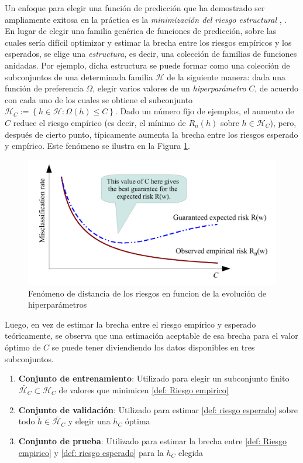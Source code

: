 Un enfoque para elegir una funci\'on de predicci\'on que ha demostrado ser ampliamente exitosa en la pr\'actica es la \textit{minimizaci\'on del riesgo estructural} \cite{vapnik:1974}, \cite{vapnik:1998}. En lugar de elegir una familia gen\'erica de funciones de predicci\'on, sobre las cuales ser\'ia dif\'icil optimizar y estimar la brecha entre los riesgos emp\'iricos y los esperados, se elige una \textit{estructura}, es decir, una colecci\'on de familias de funciones anidadas. Por ejemplo, dicha estructura se puede formar como una colecci\'on de subconjuntos de una determinada familia $\mathcal{H}$ de la siguiente manera: dada una funci\'on de preferencia $\Omega$, elegir varios valores de un \textit{hiperpar\'ametro} $C$, de acuerdo con cada uno de los cuales se obtiene el subconjunto $\mathcal{H}_C := \left\lbrace h \in \mathcal{H} : \Omega (h) \leq C \right\rbrace$. Dado un n\'umero fijo de ejemplos, el aumento de $C$ reduce el riesgo emp\'irico (es decir, el m\'inimo de $R_n (h) $ sobre $h \in \mathcal{H}_C$), pero, despu\'es de cierto punto, t\'ipicamente aumenta la brecha entre los riesgos esperado y emp\'irico. Este fen\'omeno se ilustra en la Figura \ref{gfx: hiperparametros}.

\begin{figure}[h]
	\centering
	\includegraphics[scale=.3]{gfx/hyperparametros.png}
	\caption{Fen\'omeno de distancia de los riesgos en funcion de la evoluci\'on de hiperpar\'ametros}
	\label{gfx: hiperparametros}
\end{figure}

Luego, en vez de estimar la brecha entre el riesgo emp\'irico y esperado te\'oricamente, se observa que una estimaci\'on aceptable de esa brecha para el valor \'optimo de $C$ se puede tener diviendiendo los datos disponibles en tres subconjuntos.

\begin{enumerate}
	\item {\textbf{Conjunto de entrenamiento}}: Utilizado para elegir un subconjunto finito $\tilde{\mathcal{H}_C} \subset \mathcal{H}_C$ de valores que minimicen \ref{def: Riesgo empirico}
	\item{\textbf{Conjunto de validaci\'on}}: Utilizado para estimar \ref{def: riesgo esperado} sobre todo $\tilde{h} \in \tilde{\mathcal{H}_C}$ y elegir una $h_C$ \'optima
	\item{\textbf{Conjunto de prueba}}: Utilizado para estimar la brecha entre \ref{def: Riesgo empirico} y \ref{def: riesgo esperado} para la $h_C$ elegida
\end{enumerate}

